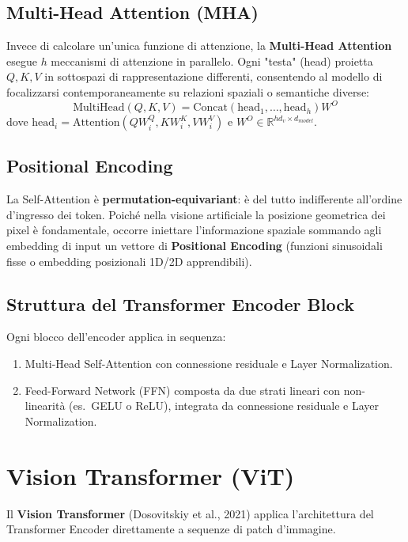 \documentclass[12pt, a4paper]{report}
\newcommand{\R}{\mathbb{R}}
\begin{document}
\subsection{Multi-Head Attention (MHA)}

Invece di calcolare un'unica funzione di attenzione, la \textbf{Multi-Head Attention}
esegue $h$ meccanismi di attenzione in parallelo. Ogni "testa" (head) proietta $Q, K, V$
in sottospazi di rappresentazione differenti, consentendo al modello di focalizzarsi
contemporaneamente su relazioni spaziali o semantiche diverse:
\[
  \mathrm{MultiHead}(Q, K, V) = \mathrm{Concat}(\text{head}_1, \ldots, \text{head}_h) W^O
\]
dove $\text{head}_i = \mathrm{Attention}(Q W_i^Q, K W_i^K, V W_i^V)$ e $W^O \in \R^{h d_v \times d_{model}}$.

\subsection{Positional Encoding}

La Self-Attention è \textbf{permutation-equivariant}: è del tutto indifferente
all'ordine d'ingresso dei token. Poiché nella visione artificiale la posizione
geometrica dei pixel è fondamentale, occorre iniettare l'informazione spaziale
sommando agli embedding di input un vettore di \textbf{Positional Encoding} (funzioni
sinusoidali fisse o embedding posizionali 1D/2D apprendibili).

\subsection{Struttura del Transformer Encoder Block}

Ogni blocco dell'encoder applica in sequenza:
\begin{enumerate}
  \item Multi-Head Self-Attention con connessione residuale e Layer Normalization.
  \item Feed-Forward Network (FFN) composta da due strati lineari con non-linearità
        (es.\ GELU o ReLU), integrata da connessione residuale e Layer Normalization.
\end{enumerate}

\section{Vision Transformer (ViT)}

Il \textbf{Vision Transformer} (Dosovitskiy et al., 2021) applica l'architettura del
Transformer Encoder direttamente a sequenze di patch d'immagine.
\end{document}
